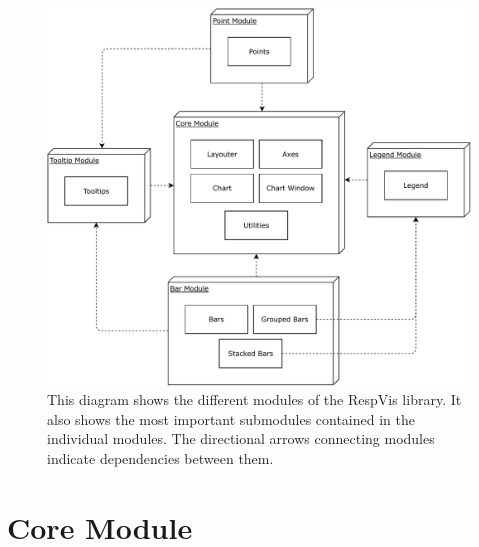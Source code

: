 \begin{figure}[tp]
  \centering
  \includegraphics[keepaspectratio,width=\linewidth,height=\fullh]{diagrams/respvis-modules.pdf}
  \caption[Modules of RespVis]{
    This diagram shows the different modules of the RespVis library.
    It also shows the most important submodules contained in the individual modules.
    The directional arrows connecting modules indicate dependencies between them.
  }
  \label{fig:Modules}
\end{figure}


\section{Core Module}

